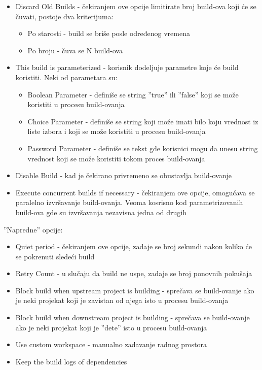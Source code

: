 \begin{itemize}  
\item Discard Old Builds - čekiranjem ove opcije limitirate broj build-ova koji će se čuvati, postoje dva kriterijuma:
\begin{itemize}
\item Po starosti - build se briše posle određenog vremena
\item Po broju - čuva se N build-ova
\end{itemize}
\item This build is parameterized - korisnik dodeljuje parametre koje će build koristiti. Neki od parametara su:
\begin{itemize}
\item Boolean Parameter - definiše se string ''true'' ili ''false'' koji se može koristiti u procesu build-ovanja
\item Choice Parameter - definiše se string koji može imati bilo koju vrednost iz liste izbora i koji se može koristiti u procesu build-ovanja
\item Password Parameter - definiše se tekst gde korisnici mogu da unesu string vrednost koji se može koristiti tokom proces build-ovanja
\end{itemize}
\item Disable Build - kad je čekirano privremeno se obustavlja build-ovanje
\item Execute concurrent builds if necessary - čekiranjem ove opcije, omogućava se paralelno izvršavanje build-ovanja. Veoma kosrisno kod parametrizovanih build-ova gde su izvršavanja nezavisna jedna od drugih
\end{itemize}

''Napredne'' opcije:
\begin{itemize}  
\item Quiet period - čekiranjem ove opcije, zadaje se broj sekundi nakon koliko će se pokrenuti sledeći build
\item Retry Count - u slučaju da build ne uspe, zadaje se broj ponovnih pokušaja
\item Block build when upstream project is building - sprečava se build-ovanje ako je neki projekat koji je zavistan od njega isto u procesu build-ovanja
\item Block build when downstream project is building - sprečava se build-ovanje ako je neki projekat koji je ''dete'' isto u procesu build-ovanja
\item Use custom workspace - manualno zadavanje radnog prostora
\item Keep the build logs of dependencies
\end{itemize}


